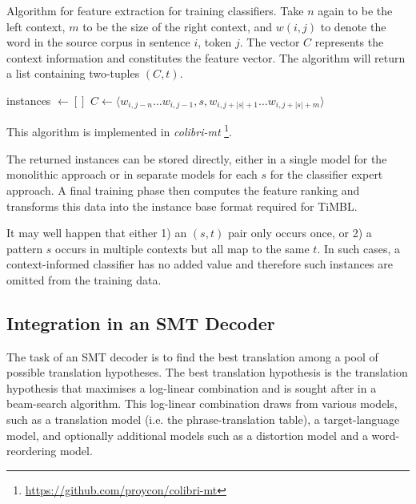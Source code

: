 \documentclass[smallextended]{svjour3}       %
\theoremstyle{break}
\begin{document}
\begin{algorithm}
\caption{Algorithm for feature extraction for training classifiers.  Take $n$
again to be the left context, $m$ to be the size of the right context, and
$w{(i,j)}$ to denote the word in the source corpus in sentence $i$, token $j$.
The vector $C$ represents the context information and constitutes the feature
vector.  The algorithm will return a list containing two-tuples $(C,t)$.  }
\label{alg:featureextract}
\begin{algorithmic}
\State instances $\gets []$
        \State $C \gets \langle w_{i,j-n} \ldots w_{i,j-1}, s, w_{i,j+|s|+1} \ldots w_{i,j+|s|+m} \rangle$
        \State {} 
      \EndFor
  \EndFor
\EndFor \\
\end{algorithmic}
\end{algorithm}
    
This algorithm is implemented in \emph{colibri-mt}
\footnote{\url{https://github.com/proycon/colibri-mt}}.

The returned instances can be stored directly, either in a single model for the
monolithic approach or in separate models for each $s$ for the classifier
expert approach. A final training phase then computes the feature ranking and
transforms this data into the instance base format required for TiMBL.

It may well happen that either 1) an $(s,t)$ pair only occurs once, or
2) a pattern $s$ occurs in multiple contexts but all map to the same
$t$. In such cases, a context-informed classifier has no added value
and therefore such instances are omitted from the training data.

\subsection{Integration in an SMT Decoder}
\label{sec:smtintegration}

The task of an SMT decoder is to find the best translation among a pool
of possible translation hypotheses. The best translation hypothesis is the
translation hypothesis that maximises a log-linear combination and is sought
after in a beam-search algorithm. This log-linear combination draws from
various models, such as a translation model (i.e. the phrase-translation
table), a target-language model, and optionally additional models such as a
distortion model and a word-reordering model. 
\end{document}
